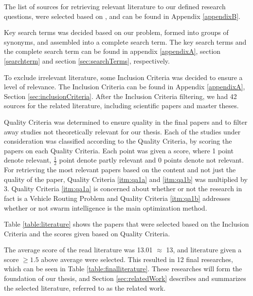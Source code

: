 The list of sources for retrieving relevant literature to our defined research questions, were selected based on \citep[p.3]{kofod2014}, and can be found in Appendix \vref{appendixB}. 

Key search terms was decided based on our problem, formed into groups of synonyms, and assembled into a complete search term. The key search terms and the complete search term can be found in appendix \ref{appendixA}, section \vref{searchterm} and section \vref{sec:searchTerms}, respectively.

To exclude irrelevant literature, some Inclusion Criteria was decided to ensure a level of relevance. The Inclusion Criteria can be found in Appendix \ref{appendixA}, Section \ref{sec:inclusionCriteria}. After the Inclusion Criteria filtering, we had 42 sources for the related literature, including scientific papers and master theses. 

Quality Criteria was determined to ensure quality in the final papers and to filter away studies not theoretically relevant for our thesis. Each of the studies under consideration was classified according to the Quality Criteria, by scoring the papers on each Quality Criteria. Each point was given a score, where 1 point denote relevant, $\frac{1}{2}$ point denote partly relevant and 0 points denote not relevant. For retrieving the most relevant papers based on the content and not just the quality of the paper, Quality Criteria \ref{itm:qa1a} and \vref{itm:qa1b} was multiplied by 3. Quality Criteria \ref{itm:qa1a} is concerned about whether or not the research in fact is a Vehicle Routing Problem and Quality Criteria \ref{itm:qa1b} addresses whether or not swarm intelligence is the main optimization method. 

Table \vref{table:literature} shows the papers that were selected based on the Inclusion Criteria and the scores given based on Quality Criteria.

The average score of the read literature was 13.01 $\approx$ 13, and literature given a score $\geq{1.5}$ above average were selected. This resulted in 12 final researches, which can be seen in Table \vref{table:finalliterature}. These researches will form the foundation of our thesis, and Section \vref{sec:relatedWork} describes and summarizes the selected literature, referred to as the related work. 
